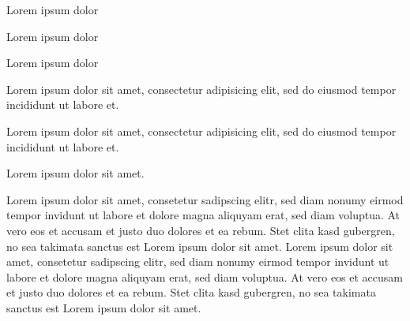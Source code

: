 \documentclass{article}
\begin{document}
{}


\begin{clozebox}
Lorem ipsum dolor
\end{clozebox}

\clozereset


\begin{clozebox}
Lorem ipsum dolor
\end{clozebox}


\begin{clozebox}[width = 1cm, rule=0.1cm]
Lorem ipsum dolor
\end{clozebox}


\clozehide

\begin{clozebox}
Lorem ipsum dolor sit amet, consectetur adipisicing elit, sed do eiusmod
tempor incididunt ut labore et.
\end{clozebox}


\clozeshow

\begin{clozebox}
Lorem ipsum dolor sit amet, consectetur adipisicing elit, sed do eiusmod
tempor incididunt ut labore et.
\end{clozebox}


\begin{clozebox}
Lorem ipsum dolor sit amet.
\end{clozebox}


\begin{clozebox}
Lorem ipsum dolor sit amet, consetetur sadipscing elitr, sed diam nonumy
eirmod tempor invidunt ut labore et dolore magna aliquyam erat, sed diam
voluptua. At vero eos et accusam et justo duo dolores et ea rebum. Stet
clita kasd gubergren, no sea takimata sanctus est Lorem ipsum dolor sit
amet. Lorem ipsum dolor sit amet, consetetur sadipscing elitr, sed diam
nonumy eirmod tempor invidunt ut labore et dolore magna aliquyam erat,
sed diam voluptua. At vero eos et accusam et justo duo dolores et ea
rebum. Stet clita kasd gubergren, no sea takimata sanctus est Lorem
ipsum dolor sit amet.
\end{clozebox}
\end{document}
